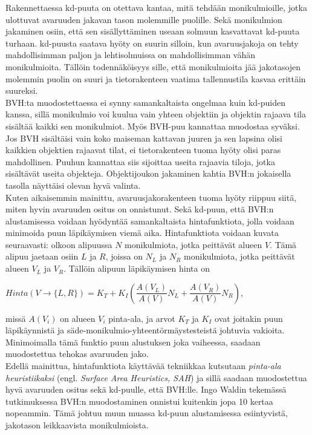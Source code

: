 \documentclass[a4paper, 12pt, titlepage]{article}
\begin{document}
Rakennettaessa kd-puuta on otettava kantaa, mitä tehdään monikulmioille, jotka ulottuvat avaruuden jakavan tason molemmille puolille. Sekä monikulmion jakaminen osiin, että sen sisällyttäminen useaan solmuun kasvattavat kd-puuta turhaan. kd-puusta saatava hyöty on suurin silloin, kun avaruusjakoja on tehty mahdollisimman paljon ja lehtisolmuissa on mahdollisimman vähän monikulmioita. Tällöin todennäköisyys sille, että monikulmioita jää jakotasojen molemmin puolin on suuri ja tietorakenteen vaatima tallennustila kasvaa erittäin suureksi. \citep[.]{wald04} \\

BVH:ta muodostettaessa ei synny samankaltaista ongelmaa kuin kd-puiden kanssa, sillä monikulmio voi kuulua vain yhteen objektiin ja objektin rajaava tila sisältää kaikki sen monikulmiot. Myös BVH-puu kannattaa muodostaa syväksi. Jos BVH sisältäisi vain koko maiseman kattavan juuren ja sen lapsina olisi kaikkien objektien rajaavat tilat, ei tietorakenteen tuoma hyöty olisi paras mahdollinen. Puuhun kannattaa siis sijoittaa useita rajaavia tiloja, jotka sisältävät useita objekteja. Objektijoukon jakaminen kahtia BVH:n jokaisella tasolla  näyttäisi olevan hyvä valinta. \citep[.]{goldsmith} \\

Kuten aikaisemmin mainittu, avaruusjakorakenteen tuoma hyöty riippuu siitä, miten hyvin avaruuden ositus on onnistunut. Sekä kd-puun, että BVH:n alustamisessa voidaan hyödyntää samankaltaista hintafunktiota, jolla voidaan minimoida puun läpikäymisen viemä aika. Hintafunktiota voidaan kuvata seuraavasti: olkoon alipuussa $N$ monikulmiota, jotka peittävät alueen $V$. Tämä alipuu jaetaan osiin $L$ ja $R$, joissa on $N_L$ ja $N_R$ monikulmiota, jotka peittävät alueen $V_L$ ja $V_R$. Tällöin alipuun läpikäymisen hinta on\\

\begin{centering} 
$Hinta(V\to\{L,R\}) = K_T + K_I(\dfrac{A(V_L)}{A(V)}N_L + \dfrac{A(V_R)}{A(V)}N_R)$,\\
\vspace{0.2cm}
\end{centering}
missä $A(V_i)$ on alueen $V_i$ pinta-ala, ja arvot $K_T$ ja $K_I$ ovat joitakin puun läpikäynnistä ja säde-monikulmio-yhteentörmäystesteistä johtuvia vakioita. Minimoimalla tämä funktio puun alustuksen joka vaiheessa, saadaan muodostettua tehokas avaruuden jako. \citep[.]{wald07}\\

Edellä mainittua, hintafunktiota käyttävää tekniikkaa kutsutaan \emph{pinta-ala heuristiikaksi} (engl. \emph{Surface Area Heuristics, SAH}) ja sillä saadaan muodostettua hyvä avaruuden ositus sekä kd-puulle, että BVH:lle. Ingo Waldin tekemässä tutkimuksessa BVH:n muodostaminen onnistui kuitenkin jopa 10 kertaa nopeammin. Tämä johtuu muun muassa kd-puun alustamisessa esiintyvistä, jakotason leikkaavista monikulmioista. \citep[.]{wald07}  
\end{document}

